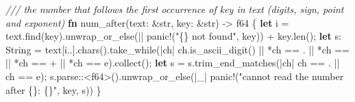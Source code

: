 \documentclass[
  10pt,
]{article}
\newenvironment{Shaded}{}{}
\newcommand{\CharTok}[1]{\textcolor[rgb]{0.25,0.44,0.63}{#1}}
\newcommand{\CommentTok}[1]{\textcolor[rgb]{0.38,0.63,0.69}{\textit{#1}}}
\newcommand{\DataTypeTok}[1]{\textcolor[rgb]{0.56,0.13,0.00}{#1}}
\newcommand{\KeywordTok}[1]{\textcolor[rgb]{0.00,0.44,0.13}{\textbf{#1}}}
\newcommand{\NormalTok}[1]{#1}
\newcommand{\OperatorTok}[1]{\textcolor[rgb]{0.40,0.40,0.40}{#1}}
\newcommand{\PreprocessorTok}[1]{\textcolor[rgb]{0.74,0.48,0.00}{#1}}
\newcommand{\StringTok}[1]{\textcolor[rgb]{0.25,0.44,0.63}{#1}}
\begin{document}
\begin{Shaded}
\begin{Highlighting}[]
\CommentTok{/// the number that follows the first occurrence of \textasciigrave{}key\textasciigrave{} in \textasciigrave{}text\textasciigrave{} (digits, sign, point and exponent)}
\KeywordTok{fn}\NormalTok{ num\_after(text}\OperatorTok{:} \OperatorTok{\&}\DataTypeTok{str}\OperatorTok{,}\NormalTok{ key}\OperatorTok{:} \OperatorTok{\&}\DataTypeTok{str}\NormalTok{) }\OperatorTok{{-}\textgreater{}} \DataTypeTok{f64} \OperatorTok{\{}
    \KeywordTok{let}\NormalTok{ i }\OperatorTok{=}\NormalTok{ text}\OperatorTok{.}\NormalTok{find(key)}\OperatorTok{.}\NormalTok{unwrap\_or\_else(}\OperatorTok{||} \PreprocessorTok{panic!}\NormalTok{(}\StringTok{"\textquotesingle{}\{\}\textquotesingle{} not found"}\OperatorTok{,}\NormalTok{ key)) }\OperatorTok{+}\NormalTok{ key}\OperatorTok{.}\NormalTok{len()}\OperatorTok{;}
    \KeywordTok{let}\NormalTok{ s}\OperatorTok{:} \DataTypeTok{String} \OperatorTok{=}\NormalTok{ text[i}\OperatorTok{..}\NormalTok{]}\OperatorTok{.}\NormalTok{chars()}\OperatorTok{.}\NormalTok{take\_while(}\OperatorTok{|}\NormalTok{ch}\OperatorTok{|}\NormalTok{ ch}\OperatorTok{.}\NormalTok{is\_ascii\_digit() }\OperatorTok{||} \OperatorTok{*}\NormalTok{ch }\OperatorTok{==} \CharTok{\textquotesingle{}.\textquotesingle{}} \OperatorTok{||} \OperatorTok{*}\NormalTok{ch }\OperatorTok{==} \CharTok{\textquotesingle{}{-}\textquotesingle{}} \OperatorTok{||} \OperatorTok{*}\NormalTok{ch }\OperatorTok{==} \CharTok{\textquotesingle{}+\textquotesingle{}} \OperatorTok{||} \OperatorTok{*}\NormalTok{ch }\OperatorTok{==} \CharTok{\textquotesingle{}e\textquotesingle{}}\NormalTok{)}\OperatorTok{.}\NormalTok{collect()}\OperatorTok{;}
    \KeywordTok{let}\NormalTok{ s }\OperatorTok{=}\NormalTok{ s}\OperatorTok{.}\NormalTok{trim\_end\_matches(}\OperatorTok{|}\NormalTok{ch}\OperatorTok{|}\NormalTok{ ch }\OperatorTok{==} \CharTok{\textquotesingle{}.\textquotesingle{}} \OperatorTok{||}\NormalTok{ ch }\OperatorTok{==} \CharTok{\textquotesingle{}e\textquotesingle{}}\NormalTok{)}\OperatorTok{;}
\NormalTok{    s}\OperatorTok{.}\PreprocessorTok{parse::}\OperatorTok{\textless{}}\DataTypeTok{f64}\OperatorTok{\textgreater{}}\NormalTok{()}\OperatorTok{.}\NormalTok{unwrap\_or\_else(}\OperatorTok{|}\NormalTok{\_}\OperatorTok{|} \PreprocessorTok{panic!}\NormalTok{(}\StringTok{"cannot read the number after \textquotesingle{}\{\}\textquotesingle{}: \textquotesingle{}\{\}\textquotesingle{}"}\OperatorTok{,}\NormalTok{ key}\OperatorTok{,}\NormalTok{ s))}
\OperatorTok{\}}


\end{Highlighting}
\end{Shaded}
\end{document}
